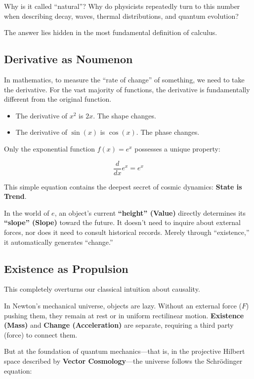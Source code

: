 \documentclass[11pt,a4paper,twoside]{book}
\begin{document}
Why is it called ``natural''? Why do physicists repeatedly turn to this number when describing decay, waves, thermal distributions, and quantum evolution?

The answer lies hidden in the most fundamental definition of calculus.

\subsection{Derivative as Noumenon}

In mathematics, to measure the ``rate of change'' of something, we need to take the derivative. For the vast majority of functions, the derivative is fundamentally different from the original function.

\begin{itemize}
\item The derivative of $x^2$ is $2x$. The shape changes.

\item The derivative of $\sin(x)$ is $\cos(x)$. The phase changes.
\end{itemize}

Only the exponential function $f(x) = e^x$ possesses a unique property:

$$\frac{d}{dx} e^x = e^x$$

This simple equation contains the deepest secret of cosmic dynamics: \textbf{State is Trend}.

In the world of $e$, an object's current \textbf{``height'' (Value)} directly determines its \textbf{``slope'' (Slope)} toward the future. It doesn't need to inquire about external forces, nor does it need to consult historical records. Merely through ``existence,'' it automatically generates ``change.''

\subsection{Existence as Propulsion}

This completely overturns our classical intuition about causality.

In Newton's mechanical universe, objects are lazy. Without an external force ($F$) pushing them, they remain at rest or in uniform rectilinear motion. \textbf{Existence (Mass)} and \textbf{Change (Acceleration)} are separate, requiring a third party (force) to connect them.

But at the foundation of quantum mechanics---that is, in the projective Hilbert space described by \textbf{Vector Cosmology}---the universe follows the Schrödinger equation:
\end{document}
